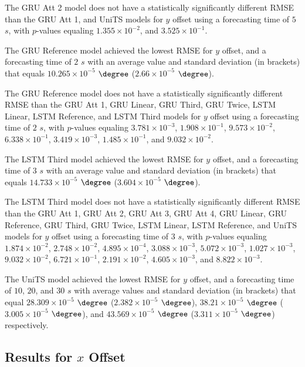 The GRU Att 2 model does not have a statistically significantly different RMSE than the GRU Att 1, and UniTS models for $y$ offset using a forecasting time of $5$ $s$, with $p$-values equaling $1.355 \times 10^{-2}$, and $3.525 \times 10^{-1}$.

The GRU Reference model achieved the lowest RMSE for $y$ offset, and a forecasting time of $2$ $s$ with an average value and standard deviation (in brackets) that equals $10.265 \times 10^{-5}$ $\degree$ ($2.66 \times 10^{-5}$ $\degree$).

The GRU Reference model does not have a statistically significantly different RMSE than the GRU Att 1, GRU Linear, GRU Third, GRU Twice, LSTM Linear, LSTM Reference, and LSTM Third models for $y$ offset using a forecasting time of $2$ $s$, with $p$-values equaling $3.781 \times 10^{-3}$, $1.908 \times 10^{-1}$, $9.573 \times 10^{-2}$, $6.338 \times 10^{-1}$, $3.419 \times 10^{-3}$, $1.485 \times 10^{-1}$, and $9.032 \times 10^{-2}$.

The LSTM Third model achieved the lowest RMSE for $y$ offset, and a forecasting time of $3$ $s$ with an average value and standard deviation (in brackets) that equals $14.733 \times 10^{-5}$ $\degree$ ($3.604 \times 10^{-5}$ $\degree$).

The LSTM Third model does not have a statistically significantly different RMSE than the GRU Att 1, GRU Att 2, GRU Att 3, GRU Att 4, GRU Linear, GRU Reference, GRU Third, GRU Twice, LSTM Linear, LSTM Reference, and UniTS models for $y$ offset using a forecasting time of $3$ $s$, with $p$-values equaling $1.874 \times 10^{-2}$, $2.748 \times 10^{-2}$, $4.895 \times 10^{-4}$, $3.088 \times 10^{-3}$, $5.072 \times 10^{-3}$, $1.027 \times 10^{-3}$, $9.032 \times 10^{-2}$, $6.721 \times 10^{-1}$, $2.191 \times 10^{-2}$, $4.605 \times 10^{-3}$, and $8.822 \times 10^{-3}$.

The UniTS model achieved the lowest RMSE for $y$ offset, and a forecasting time of $10$, $20$, and $30$ $s$ with average values and standard deviation (in brackets) that equal $28.309 \times 10^{-5}$ $\degree$ ($2.382 \times 10^{-5}$ $\degree$), $38.21 \times 10^{-5}$ $\degree$ ($3.005 \times 10^{-5}$ $\degree$), and $43.569 \times 10^{-5}$ $\degree$ ($3.311 \times 10^{-5}$ $\degree$) respectively.

\subsection{Results for $x$ Offset}

